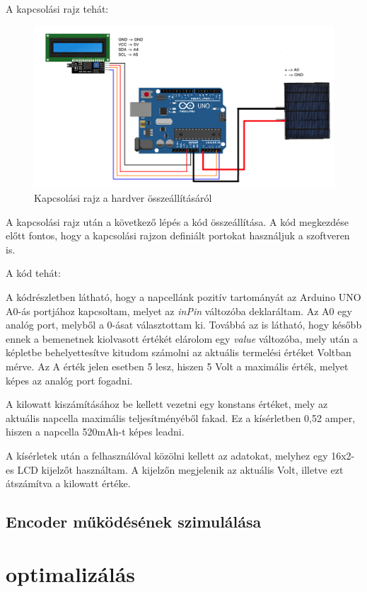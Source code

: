 \documentclass[
]{thesis-ekf}
\theoremstyle{definition}
\theoremstyle{remark}
\begin{document}
			\par A kapcsolási rajz tehát:
			\begin{figure}[ht]
				\centering
				\includegraphics[scale=0.30]{./images/solarCalculator}
				\caption{Kapcsolási rajz a hardver összeállításáról}
			\end{figure}
			\par A kapcsolási rajz után a következő lépés a kód összeállítása. A kód megkezdése előtt fontos, hogy a kapcsolási rajzon definiált portokat használjuk a szoftveren is.
			\par A kód tehát:
						
			A kódrészletben látható, hogy a napcellánk pozitív tartományát az Arduino UNO A0-ás portjához kapcsoltam, melyet az \textit{inPin} változóba deklaráltam. Az A0 egy analóg port, melyből a 0-ásat választottam ki. Továbbá az is látható, hogy később ennek a bemenetnek kiolvasott értékét elárolom egy \textit{value} változóba, mely után a képletbe behelyettesítve kitudom számolni az aktuális termelési értéket Voltban mérve. Az A érték jelen esetben 5 lesz, hiszen 5 Volt a maximális érték, melyet képes az analóg port fogadni.
			\par A kilowatt kiszámításához be kellett vezetni egy konstans értéket, mely az aktuális napcella maximális teljesítményéből fakad. Ez a kísérletben 0,52 amper, hiszen a napcella 520mAh-t képes leadni. 
			\par A kísérletek után a felhasználóval közölni kellett az adatokat, melyhez egy 16x2-es LCD kijelzőt használtam. A kijelzőn megjelenik az aktuális Volt, illetve ezt átszámítva a kilowatt értéke.
			
		\subsection{Encoder működésének szimulálása}
	\section{optimalizálás}
\end{document}
